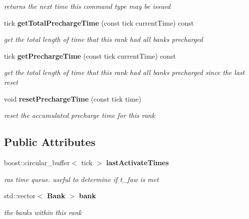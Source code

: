 \begin{CompactItemize}
\begin{CompactList}\small\item\em returns the next time this command type may be issued \item\end{CompactList}\item 
tick {\bf getTotalPrechargeTime} (const tick currentTime) const 
\begin{CompactList}\small\item\em get the total length of time that this rank had all banks precharged \item\end{CompactList}\item 
tick {\bf getPrechargeTime} (const tick currentTime) const 
\begin{CompactList}\small\item\em get the total length of time that this rank had all banks precharged since the last reset \item\end{CompactList}\item 
void {\bf resetPrechargeTime} (const tick time)\label{class_d_r_a_msim_i_i_1_1_rank_322fa6968838e2c07924131af8b5b187}

\begin{CompactList}\small\item\em reset the accumulated precharge time for this rank \item\end{CompactList}\end{CompactItemize}
\subsection*{Public Attributes}
\begin{CompactItemize}
\item 
boost::circular\_\-buffer$<$ tick $>$ {\bf lastActivateTimes}\label{class_d_r_a_msim_i_i_1_1_rank_4f99ad980186f688ca96c255b5c91942}

\begin{CompactList}\small\item\em ras time queue. useful to determine if t\_\-faw is met \item\end{CompactList}\item 
std::vector$<$ {\bf Bank} $>$ {\bf bank}\label{class_d_r_a_msim_i_i_1_1_rank_f1ecef74d5e6a979ab3fef7fafca907e}

\begin{CompactList}\small\item\em the banks within this rank \item\end{CompactList}\end{CompactItemize}
